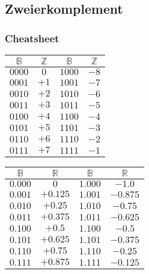 \subsection{Zweierkomplement}

\subsubsection{Cheatsheet}
\begin{center}
    \begin{tabular}{c|c||c|c}
        $\mathbb{B}$ & $\mathbb{Z}$ &$\mathbb{B}$ & $\mathbb{Z}$\\
        \hline
        $0000$ & $0$  & $1000$ & $-8$\\
        $0001$ & $+1$ & $1001$ & $-7$\\ 
        $0010$ & $+2$ & $1010$ & $-6$\\
        $0011$ & $+3$ & $1011$ & $-5$\\ 
        $0100$ & $+4$ & $1100$ & $-4$\\ 
        $0101$ & $+5$ & $1101$ & $-3$\\
        $0110$ & $+6$ & $1110$ & $-2$\\
        $0111$ & $+7$ & $1111$ & $-1$\\
    \end{tabular}
\end{center}
\begin{center}
    \begin{tabular}{c|c||c|c}
        $\mathbb{B}$ & $\mathbb{R}$ &$\mathbb{B}$ & $\mathbb{R}$\\
        \hline
        $0.000$ & $0$ & $1.000$ & $-1.0$\\
        $0.001$ & $+ 0.125$ & $1.001$ & $-0.875$\\
        $0.010$ & $+0.25$ & $1.010$ & $-0.75$\\
        $0.011$ & $+0.375$ & $1.011$ & $-0.625$\\
        $0.100$ & $+0.5$ & $1.100$ & $-0.5$\\
        $0.101$ & $+0.625$ & $1.101$ & $-0.375$\\
        $0.110$ & $+0.75$ & $1.110$ & $-0.25$\\
        $0.111$ & $+0.875$ & $1.111$ & $-0.125$\\
    \end{tabular}
\end{center}